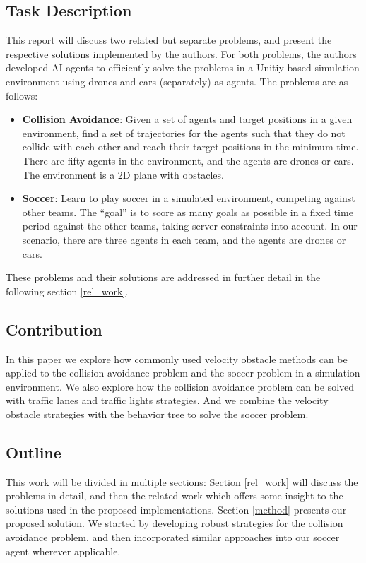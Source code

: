 \documentclass[a4paper,12pt]{article}
\begin{document}
\subsection{Task Description}

This report will discuss two related but separate problems, and present the respective solutions implemented by the authors. For both problems, the authors developed AI agents to efficiently solve the problems in a Unitiy-based simulation environment using drones and cars (separately) as agents. The problems are as follows:

\begin{itemize}
    \item \textbf{Collision Avoidance}: Given a set of agents and target positions in a given environment, find a set of trajectories for the agents such that they do not collide with each other and reach their target positions in the minimum time. There are fifty agents in the environment, and the agents are drones or cars. The environment is a 2D plane with obstacles.
    
    \item \textbf{Soccer}: Learn to play soccer in a simulated environment, competing against other teams. The ``goal'' is to score as many goals as possible in a fixed time period against the other teams, taking server constraints into account. In our scenario, there are three agents in each team, and the agents are drones or cars.
    
\end{itemize}


These problems and their solutions are addressed in further detail in the following section \ref{rel_work}.




\subsection{Contribution}

In this paper we explore how commonly used velocity obstacle methods can be applied to the collision avoidance problem and the soccer problem in a
simulation environment. We also explore how the collision avoidance problem can be solved with traffic lanes and traffic lights strategies. 
And we combine the velocity obstacle strategies with the behavior tree to solve the soccer problem.



\subsection{Outline}
This work will be divided in multiple sections: Section \ref{rel_work} will discuss the problems in detail, and then the related work which offers some insight to the solutions used in the proposed implementations. Section \ref{method} presents our proposed solution. We started by developing robust strategies for the collision avoidance problem, and then incorporated similar approaches into our soccer agent wherever applicable. 
\end{document}
